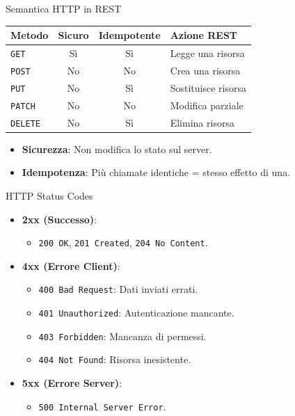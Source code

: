 \documentclass[10pt]{beamer}
\begin{document}
\begin{frame}{Semantica HTTP in REST}
    \centering
    \begin{table}
    \begin{tabular}{lccl}
    \toprule
    \textbf{Metodo} & \textbf{Sicuro} & \textbf{Idempotente} & \textbf{Azione REST} \\
    \midrule
    \texttt{GET}    & S\`i & S\`i & Legge una risorsa \\
    \texttt{POST}   & No & No & Crea una risorsa \\
    \texttt{PUT}    & No & S\`i & Sostituisce risorsa \\
    \texttt{PATCH}  & No & No & Modifica parziale \\
    \texttt{DELETE} & No & S\`i & Elimina risorsa \\
    \bottomrule
    \end{tabular}
    \end{table}
    \vspace{0.3cm}
    \begin{itemize}
        \item \textbf{Sicurezza}: Non modifica lo stato sul server.
        \item \textbf{Idempotenza}: Pi\`u chiamate identiche = stesso effetto di una.
    \end{itemize}
\end{frame}

\begin{frame}{HTTP Status Codes}
    \begin{itemize}
        \item \textbf{2xx (Successo)}:
        \begin{itemize}
            \item \texttt{200 OK}, \texttt{201 Created}, \texttt{204 No Content}.
        \end{itemize}
        \item \textbf{4xx (Errore Client)}:
        \begin{itemize}
            \item \texttt{400 Bad Request}: Dati inviati errati.
            \item \texttt{401 Unauthorized}: Autenticazione mancante.
            \item \texttt{403 Forbidden}: Mancanza di permessi.
            \item \texttt{404 Not Found}: Risorsa inesistente.
        \end{itemize}
        \item \textbf{5xx (Errore Server)}:
        \begin{itemize}
            \item \texttt{500 Internal Server Error}.
        \end{itemize}
    \end{itemize}
\end{frame}
\end{document}
